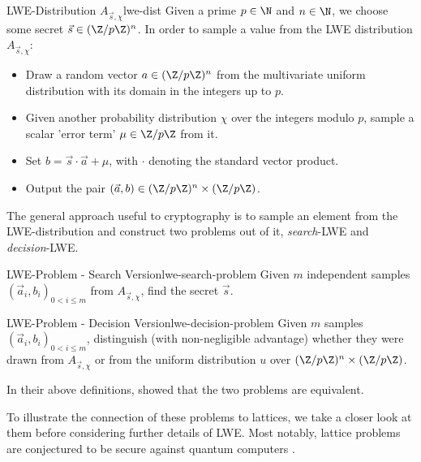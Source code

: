 \begin{definition}{LWE-Distribution $A_{\vec{s}, \chi}$}{lwe-dist}
  Given a prime $p \in \N$ and $n \in \N$, we choose some secret $\vec{s} \in (\Z / p \Z)^n$.
  In order to sample a value from the LWE distribution $A_{\vec{s}, \chi}$:
  \begin{itemize}
    \item Draw a random vector $a \in (\Z/p\Z)^n$ from the multivariate uniform distribution
          with its domain in the integers up to $p$.
    \item Given another probability distribution $\chi$ over the integers modulo $p$,
          sample a scalar 'error term' $\mu \in \Z / p \Z$ from it.
    \item Set $b = \vec{s} \cdot \vec{a} + \mu$, with $\cdot$ denoting the standard vector product.
    \item Output the pair $(\vec{a}, b) \in (\Z / p \Z)^n \times (\Z / p \Z)$.
  \end{itemize}
\end{definition}

The general approach useful to cryptography is to sample an element from the LWE-distribution and construct
two problems out of it, \textit{search}-LWE and \textit{decision}-LWE.

\begin{definition}{LWE-Problem - Search Version}{lwe-search-problem}
  Given $m$ independent samples $(\vec{a}_i, b_i)_{0 < i \leq m}$ from $A_{\vec{s}, \chi}$, find the secret $\vec{s}$.
\end{definition}
\begin{definition}{LWE-Problem - Decision Version}{lwe-decision-problem}
  Given $m$ samples $(\vec{a}_i, b_i)_{0 < i \leq m}$, distinguish (with non-negligible advantage)
  whether they were drawn from $A_{\vec{s}, \chi}$ or from the uniform distribution
  $u$ over $(\Z / p \Z)^n \times (\Z / p \Z)$.
\end{definition}

In their above definitions, \citeauthor{2005-lwe-original} showed that the two problems are equivalent.

To illustrate the connection of these problems to lattices, we
take a closer look at them before considering further details of LWE.
Most notably, lattice problems are conjectured to be secure against quantum computers \parencite{2018-lattice-problems}.

